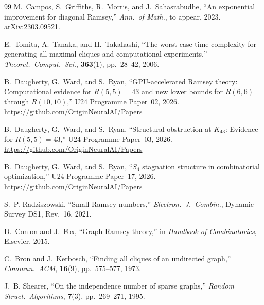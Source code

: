 \documentclass[12pt,a4paper]{article}
\theoremstyle{definition}
\theoremstyle{remark}
\begin{document}
\begin{thebibliography}{99}
M.~Campos, S.~Griffiths, R.~Morris, and J.~Sahasrabudhe,
``An exponential improvement for diagonal Ramsey,''
\textit{Ann.\ of Math.}, to appear, 2023.
arXiv:2303.09521.

E.~Tomita, A.~Tanaka, and H.~Takahashi,
``The worst-case time complexity for generating all maximal cliques and computational experiments,''
\textit{Theoret.\ Comput.\ Sci.}, \textbf{363}(1), pp.~28--42, 2006.

B.~Daugherty, G.~Ward, and S.~Ryan,
``GPU-accelerated Ramsey theory: Computational evidence for $R(5,5) = 43$ and new lower bounds for $R(6,6)$ through $R(10,10)$,''
U24 Programme Paper~02, 2026.
\url{https://github.com/OriginNeuralAI/Papers}

B.~Daugherty, G.~Ward, and S.~Ryan,
``Structural obstruction at $K_{43}$: Evidence for $R(5,5) = 43$,''
U24 Programme Paper~03, 2026.
\url{https://github.com/OriginNeuralAI/Papers}

B.~Daugherty, G.~Ward, and S.~Ryan,
``$S_4$ stagnation structure in combinatorial optimization,''
U24 Programme Paper~17, 2026.
\url{https://github.com/OriginNeuralAI/Papers}

S.~P. Radziszowski,
``Small Ramsey numbers,''
\textit{Electron.\ J.\ Combin.}, Dynamic Survey DS1, Rev.~16, 2021.

D.~Conlon and J.~Fox,
``Graph Ramsey theory,''
in \textit{Handbook of Combinatorics}, Elsevier, 2015.

C.~Bron and J.~Kerbosch,
``Finding all cliques of an undirected graph,''
\textit{Commun.\ ACM}, \textbf{16}(9), pp.~575--577, 1973.

J.~B. Shearer,
``On the independence number of sparse graphs,''
\textit{Random Struct.\ Algorithms}, \textbf{7}(3), pp.~269--271, 1995.

\end{thebibliography}
\end{document}
